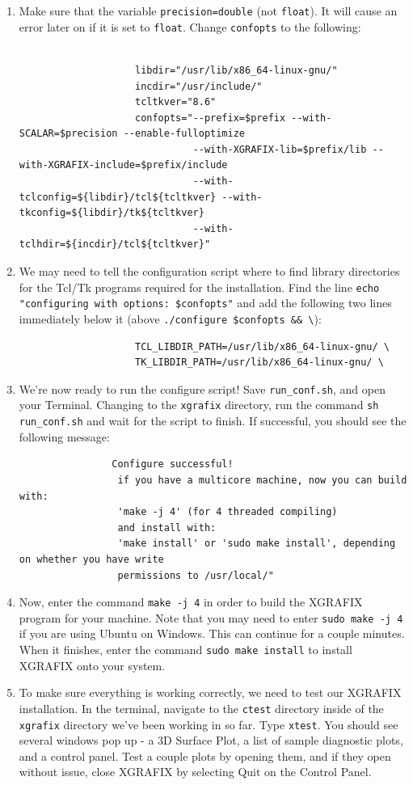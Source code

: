 \documentclass{article}
\begin{document}
\begin{enumerate}
		\item Make sure that the variable \verb|precision=double| (not \verb|float|). It will cause an error later on if it is set to \verb|float|. Change \verb|confopts| to the following:
		\begin{verbatim}
			        
			        libdir="/usr/lib/x86_64-linux-gnu/"
			        incdir="/usr/include/"
			        tcltkver="8.6"
			        confopts="--prefix=$prefix --with-SCALAR=$precision --enable-fulloptimize
			                  --with-XGRAFIX-lib=$prefix/lib --with-XGRAFIX-include=$prefix/include
			                  --with-tclconfig=${libdir}/tcl${tcltkver} --with-tkconfig=${libdir}/tk${tcltkver}
			                  --with-tclhdir=${incdir}/tcl${tcltkver}"
		\end{verbatim}
		
		
		\item We may need to tell the configuration script where to find library directories for the Tcl/Tk programs required for the installation. Find the line \verb|echo "configuring with options: $confopts"| and add the following two lines immediately below it (above \verb|./configure $confopts && \|):
		\begin{verbatim}
		            TCL_LIBDIR_PATH=/usr/lib/x86_64-linux-gnu/ \
		            TK_LIBDIR_PATH=/usr/lib/x86_64-linux-gnu/ \
		\end{verbatim}
		
		\item We're now ready to run the configure script! Save \verb|run_conf.sh|, and open your Terminal. Changing to the \verb|xgrafix| directory, run the command \verb|sh run_conf.sh| and wait for the script to finish. If successful, you should see the following message: 
		\begin{verbatim}
		        Configure successful!
		         if you have a multicore machine, now you can build with:
		         'make -j 4' (for 4 threaded compiling)
		         and install with:
		         'make install' or 'sudo make install', depending on whether you have write
		         permissions to /usr/local/"
		\end{verbatim}
		
		\item Now, enter the command \verb|make -j 4| in order to build the XGRAFIX program for your machine. Note that you may need to enter \verb|sudo make -j 4| if you are using Ubuntu on Windows. This can continue for a couple minutes. When it finishes, enter the command \verb|sudo make install| to install XGRAFIX onto your system. 
		
		\item To make sure everything is working correctly, we need to test our XGRAFIX installation. In the terminal, navigate to the \verb|ctest| directory inside of the \verb|xgrafix| directory we've been working in so far. Type \verb|xtest|. You should see several windows pop up - a 3D Surface Plot, a list of sample diagnostic plots, and a control panel. Test a couple plots by opening them, and if they open without issue, close XGRAFIX by selecting Quit on the Control Panel. 
	\end{enumerate}
\end{document}
